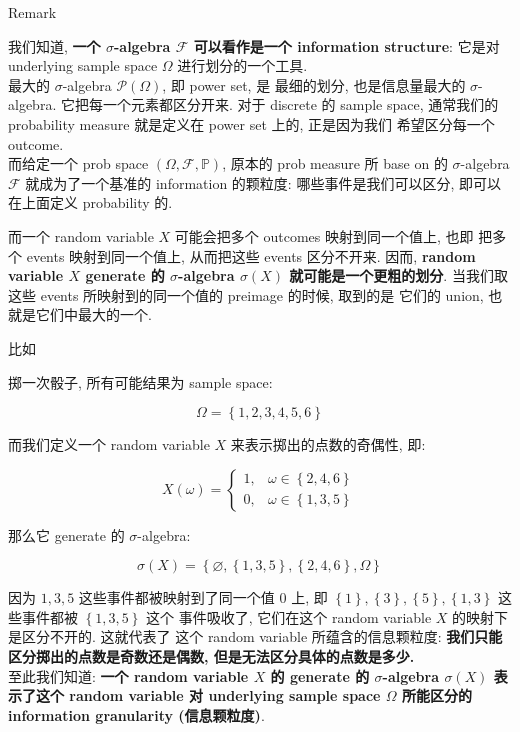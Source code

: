 \begin{qlremark}{Remark}

我们知道, \textbf{一个 \(\mathit{\sigma}\)-algebra \(\mathcal{F}\) 可以看作是一个 information structure}: 它是对 underlying sample space \(\Omega\) 进行划分的一个工具.\\
最大的 \(\mathit{\sigma}\)-algebra \(\mathcal{P}(\Omega)\), 即 power set, 是 最细的划分, 也是信息量最大的 \(\mathit{\sigma}\)-algebra. 它把每一个元素都区分开来. 对于 discrete 的 sample space, 通常我们的 probability measure 就是定义在 power set 上的, 正是因为我们 希望区分每一个 outcome.\\
而给定一个 prob space \((\Omega,\mathcal{F},\mathbb{P})\), 原本的 prob measure 所 base on 的 \(\mathit{\sigma}\)-algebra \(\mathcal{F}\) 就成为了一个基准的 information 的颗粒度: 哪些事件是我们可以区分, 即可以在上面定义 probability 的.

而一个 random variable \(\mathit{X}\) 可能会把多个 outcomes 映射到同一个值上, 也即 把多个 events 映射到同一个值上, 从而把这些 events 区分不开来. 因而, \textbf{random variable \(\mathit{X}\) generate 的 \(\mathit{\sigma}\)-algebra \(\mathit{\sigma}(\mathit{X})\) 就可能是一个更粗的划分}. 当我们取这些 events 所映射到的同一个值的 preimage 的时候, 取到的是 它们的 union, 也就是它们中最大的一个.

比如

\begin{example}

掷一次骰子, 所有可能结果为 sample space:

\[\Omega = \left\{ {1,2,3,4,5,6} \right\}\]

而我们定义一个 random variable \(\mathit{X}\) 来表示掷出的点数的奇偶性, 即:

\[\mathit{X}(\mathit{\omega}) = \left\{ \begin{matrix}
{1,} & {\mathit{\omega} \in \left\{ {2,4,6} \right\}} \\
{0,} & {\mathit{\omega} \in \left\{ {1,3,5} \right\}}
\end{matrix} \right.\]

那么它 generate 的 \(\mathit{\sigma}\)-algebra:

\[\mathit{\sigma}(\mathit{X}) = \left\{ {\varnothing,\left\{ {1,3,5} \right\},\left\{ {2,4,6} \right\},\Omega} \right\}\]

因为 \(1,3,5\) 这些事件都被映射到了同一个值 \(0\) 上, 即 \(\left\{ 1 \right\},\left\{ 3 \right\},\left\{ 5 \right\},\left\{ {1,3} \right\}\) 这些事件都被 \(\left\{ {1,3,5} \right\}\) 这个 事件吸收了, 它们在这个 random variable \(\mathit{X}\) 的映射下是区分不开的. 这就代表了 这个 random variable 所蕴含的信息颗粒度: \textbf{我们只能区分掷出的点数是奇数还是偶数, 但是无法区分具体的点数是多少.}\\
至此我们知道: \textbf{一个 random variable \(\mathit{X}\) 的 generate 的 \(\mathit{\sigma}\)-algebra \(\mathit{\sigma}(\mathit{X})\) 表示了这个 random variable 对 underlying sample space \(\Omega\) 所能区分的 information granularity (信息颗粒度)}.\\

\end{example}

\end{qlremark}

